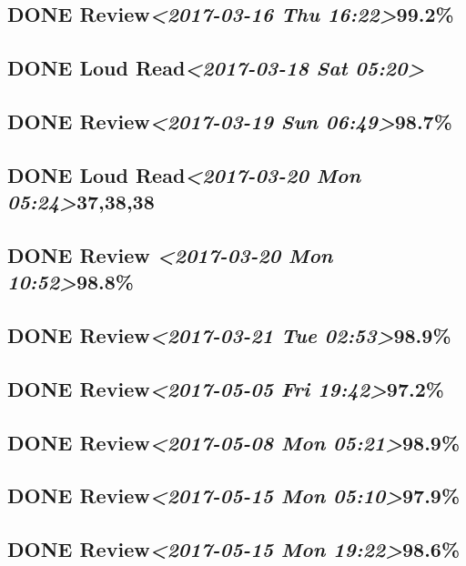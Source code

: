 \documentclass[11pt]{ctexart}
\begin{document}
\subsection{{\bfseries\sffamily DONE} Review\textit{<2017-03-16 Thu 16:22>}99.2\%}
\label{sec:org472b7ba}
\subsection{{\bfseries\sffamily DONE} Loud Read\textit{<2017-03-18 Sat 05:20>}}
\label{sec:orgc402bcd}
\subsection{{\bfseries\sffamily DONE} Review\textit{<2017-03-19 Sun 06:49>}98.7\%}
\label{sec:org5f3ee3f}
\subsection{{\bfseries\sffamily DONE} Loud Read\textit{<2017-03-20 Mon 05:24>}37,38,38}
\label{sec:org79cda24}
\subsection{{\bfseries\sffamily DONE} Review \textit{<2017-03-20 Mon 10:52>}98.8\%}
\label{sec:orgbd2fdf0}
\subsection{{\bfseries\sffamily DONE} Review\textit{<2017-03-21 Tue 02:53>}98.9\%}
\label{sec:org31dc003}
\subsection{{\bfseries\sffamily DONE} Review\textit{<2017-05-05 Fri 19:42>}97.2\%}
\label{sec:orgd789684}
\subsection{{\bfseries\sffamily DONE} Review\textit{<2017-05-08 Mon 05:21>}98.9\%}
\label{sec:orgf750cdb}
\subsection{{\bfseries\sffamily DONE} Review\textit{<2017-05-15 Mon 05:10>}97.9\%}
\label{sec:orgb233dc3}
\subsection{{\bfseries\sffamily DONE} Review\textit{<2017-05-15 Mon 19:22>}98.6\%}
\label{sec:org4532b94}
\end{document}
